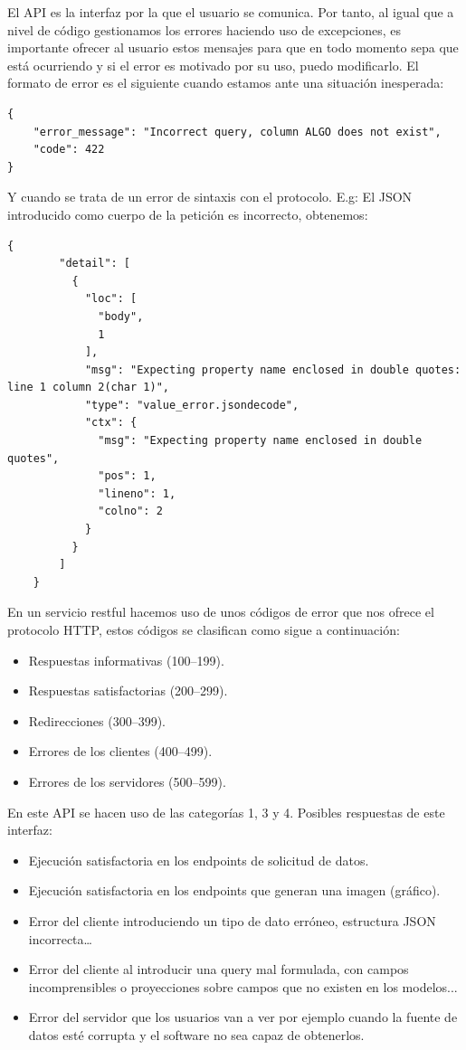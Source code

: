 El API es la interfaz por la que el usuario se comunica. Por tanto, al igual que a nivel
de código gestionamos los errores haciendo uso de excepciones, es importante ofrecer al
usuario estos mensajes para que en todo momento sepa que está ocurriendo y si el error es
motivado por su uso, puedo modificarlo. El formato de error es el siguiente cuando estamos
ante una situación inesperada:
\begin{verbatim}
{
    "error_message": "Incorrect query, column ALGO does not exist",
    "code": 422
}
\end{verbatim}
Y cuando se trata de un error de sintaxis con el protocolo. E.g: El JSON introducido como
cuerpo de la petición es incorrecto, obtenemos:
\begin{lstlisting}[caption=Error de sintaxis en el body.] 
    {
        "detail": [
          {
            "loc": [
              "body",
              1
            ],
            "msg": "Expecting property name enclosed in double quotes: line 1 column 2(char 1)",
            "type": "value_error.jsondecode",
            "ctx": {
              "msg": "Expecting property name enclosed in double quotes",
              "pos": 1,
              "lineno": 1,
              "colno": 2
            }
          }
        ]
    }
\end{lstlisting}

En un servicio restful hacemos uso de unos códigos de error que nos ofrece el protocolo
HTTP, estos códigos se clasifican como sigue a continuación:
\begin{itemize}
    \item Respuestas informativas (100–199).
    \item Respuestas satisfactorias (200–299).
    \item Redirecciones (300–399).
    \item Errores de los clientes (400–499).
    \item Errores de los servidores (500–599).
\end{itemize}

En este API se hacen uso de las categorías 1, 3 y 4. Posibles respuestas de este interfaz:
\begin{itemize}
    \item {} Ejecución satisfactoria en los endpoints de solicitud de datos.
    \item {} Ejecución satisfactoria en los endpoints que generan una imagen
    (gráfico).
    \item {} Error del cliente introduciendo un tipo de dato erróneo,
    estructura JSON incorrecta\ldots
    \item {} Error del cliente al introducir una query mal formulada, con
    campos incomprensibles o proyecciones sobre campos que no existen en los modelos...
    \item {} Error del servidor que los usuarios van a ver por ejemplo cuando
    la fuente de datos esté corrupta y el software no sea capaz de obtenerlos.
\end{itemize}

